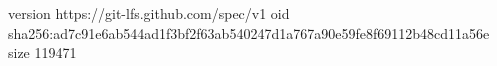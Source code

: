 version https://git-lfs.github.com/spec/v1
oid sha256:ad7c91e6ab544ad1f3bf2f63ab540247d1a767a90e59fe8f69112b48cd11a56e
size 119471
